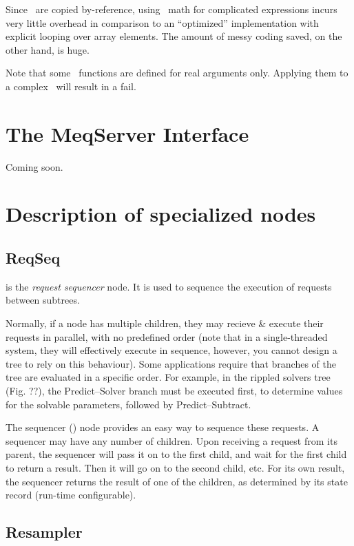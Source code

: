   Since \Vells\ are copied by-reference, using \Vells\ math for complicated
  expressions incurs very little overhead in comparison to an ``optimized''
  implementation with explicit looping over array elements. The amount of
  messy coding saved, on the other hand, is huge.
  
  Note that some \Vells\ functions are defined for real arguments only. Applying
  them to a complex \Vells\ will result in a fail.


\chapter{The MeqServer Interface}
\label{chap:meqserver}
\label{sec:meqserver}
\label{sec:meqforest}

  Coming soon.

\chapter{Description of specialized nodes}

\section{ReqSeq}

   is the {\em request sequencer} node. It is used to sequence the
  execution of requests between subtrees.
  
  Normally, if a node has multiple children, they may recieve \& execute their
  requests in parallel, with no predefined order (note that in a
  single-threaded system, they will effectively execute in sequence, however,
  you cannot design a tree to rely on this behaviour). Some applications
  require that branches of the tree are evaluated in a specific order. For
  example, in the rippled solvers tree (Fig. ??), the Predict--Solver branch
  must be executed first, to determine values for the solvable parameters,
  followed by Predict--Subtract.
  
  The sequencer () node provides an easy way to sequence these
  requests. A sequencer may have any number of children. Upon receiving a
  request from its parent, the sequencer will pass it on to the first child,
  and wait for the first child to return a result. Then it will go on to the
  second child, etc. For its own result, the sequencer returns the result of
  one of the children, as determined by its state record (run-time
  configurable).

\section{Resampler}

